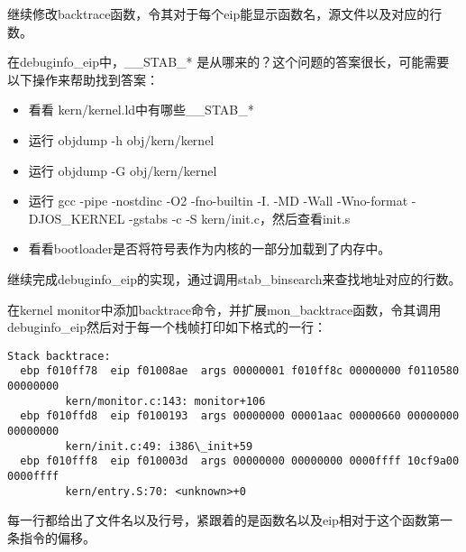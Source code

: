 \begin{exerciseEnv}{12}

    \par 继续修改backtrace函数，令其对于每个eip能显示函数名，源文件以及对应的行数。
    \par 在debuginfo\_eip中，\_\_STAB\_* 是从哪来的？这个问题的答案很长，可能需要以下操作来帮助找到答案：
    \begin{itemize}
        \item 看看 kern/kernel.ld中有哪些\_\_STAB\_*
        \item 运行 objdump -h obj/kern/kernel
        \item 运行 objdump -G obj/kern/kernel
        \item 运行 gcc -pipe -nostdinc -O2 -fno-builtin -I. -MD -Wall -Wno-format -DJOS\_KERNEL -gstabs -c -S kern/init.c，然后查看init.s
        \item 看看bootloader是否将符号表作为内核的一部分加载到了内存中。
    \end{itemize}
    \par 继续完成debuginfo\_eip的实现，通过调用stab\_binsearch来查找地址对应的行数。
    \par 在kernel monitor中添加backtrace命令，并扩展mon\_backtrace函数，令其调用debuginfo\_eip然后对于每一个栈帧打印如下格式的一行：

    \begin{lstlisting}[numbers=none,framexleftmargin=0mm,xleftmargin=0mm]
Stack backtrace:
  ebp f010ff78  eip f01008ae  args 00000001 f010ff8c 00000000 f0110580 00000000
         kern/monitor.c:143: monitor+106
  ebp f010ffd8  eip f0100193  args 00000000 00001aac 00000660 00000000 00000000
         kern/init.c:49: i386\_init+59
  ebp f010fff8  eip f010003d  args 00000000 00000000 0000ffff 10cf9a00 0000ffff
         kern/entry.S:70: <unknown>+0
    \end{lstlisting}
    \par 每一行都给出了文件名以及行号，紧跟着的是函数名以及eip相对于这个函数第一条指令的偏移。
\end{exerciseEnv}

